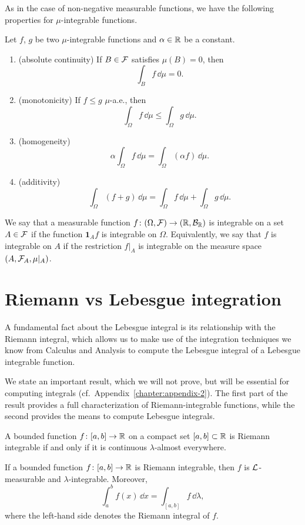 As in the case of non-negative measurable functions, we have the following properties for $\mu$-integrable functions.

\begin{proposition}
	Let $f$, $g$ be two $\mu$-integrable functions and $\alpha \in \mathbb R$ be a constant.
	\begin{enumerate}
		\item (absolute continuity) If $B \in \mathcal F$ satisfies $\mu(B) = 0$, then
		\[
		\int_{B} f\, \dd \mu = 0. 
		\]
		\item (monotonicity) If $f \leq g$ $\mu$-a.e., then
		\[
		\int_\Omega f \,\dd \mu \leq \int_\Omega g \,\dd \mu.
		\]
		\item (homogeneity) 
		\[
		\alpha \int_\Omega f \,\dd \mu = \int_\Omega (\alpha f )\,\dd \mu.
		\]
		\item (additivity)
		\[
		\int_\Omega (f + g)\, \dd \mu = \int_\Omega f 
		\,\dd \mu + \int_\Omega g \,\dd \mu.
		\]	
	\end{enumerate}
\end{proposition}

\begin{definition}
We say that a measurable function $f\colon(\Omega, \mathcal F) \to (\mathbb R, \mathcal B_{\mathbb R})$ is integrable on a set $A \in \mathcal F$ if the function $\mathbf{1}_A f$ is integrable on $\Omega$. Equivalently, we say that $f$ is integrable on $A$ if the restriction $f|_A$ is integrable on the measure space $(A, \mathcal F_A, \mu|_A)$. 
\end{definition}

\section{Riemann vs Lebesgue integration}

A fundamental fact about the Lebesgue integral is its relationship with the Riemann integral, which allows us to make use of the integration techniques we know from Calculus and Analysis to compute the Lebesgue integral of a Lebesgue integrable function.

We state an important result, which we will not prove, but will be essential for computing integrals (cf.\ Appendix~\ref{chapter:appendix-2}). The first part of the result provides a full characterization of Riemann-integrable functions, while the second provides the means to compute Lebesgue integrals.

\begin{theorem}\label{thm:riem-leb}
	A bounded function $f\colon [a,b] \to \mathbb R$ on a compact set $[a,b]\subset\mathbb R$ is Riemann integrable if and only if it is continuous $\lambda$-almost everywhere.
	
	If a bounded function $f\colon [a,b] \to \mathbb R$ is Riemann integrable, then $f$ is $\mathcal L$-measurable and $\lambda$-integrable. Moreover,
	\[
		\int_a^b f(x) \,\dd x = \int_{[a,b]} f \,\dd \lambda,
	\]
	where the left-hand side denotes the Riemann integral of $f$.
\end{theorem}

